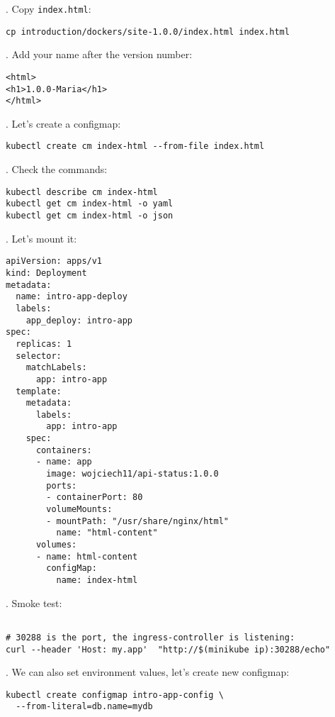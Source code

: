 \documentclass[12pt, letterpaper]{article}
\begin{document}
. Copy \verb|index.html|:

\begin{verbatim}
cp introduction/dockers/site-1.0.0/index.html index.html
\end{verbatim}

. Add your name after the version number:

\begin{verbatim}
<html>
<h1>1.0.0-Maria</h1>
</html>
\end{verbatim}

. Let's create a configmap:

\begin{verbatim}
kubectl create cm index-html --from-file index.html
\end{verbatim}

. Check the commands:

\begin{verbatim}
kubectl describe cm index-html
kubectl get cm index-html -o yaml
kubectl get cm index-html -o json
\end{verbatim}

. Let's mount it:

\begin{verbatim}
apiVersion: apps/v1
kind: Deployment
metadata:
  name: intro-app-deploy
  labels:
    app_deploy: intro-app
spec:
  replicas: 1
  selector:
    matchLabels:
      app: intro-app
  template:
    metadata:
      labels:
        app: intro-app
    spec:
      containers:
      - name: app
        image: wojciech11/api-status:1.0.0
        ports:
        - containerPort: 80
        volumeMounts:
        - mountPath: "/usr/share/nginx/html"
          name: "html-content"
      volumes:
      - name: html-content
        configMap:
          name: index-html
\end{verbatim}

. Smoke test:

\begin{verbatim}

# 30288 is the port, the ingress-controller is listening:
curl --header 'Host: my.app'  "http://$(minikube ip):30288/echo"
\end{verbatim}

. We can also set environment values, let's create new configmap:

\begin{verbatim}
kubectl create configmap intro-app-config \
  --from-literal=db.name=mydb
\end{verbatim}
\end{document}
